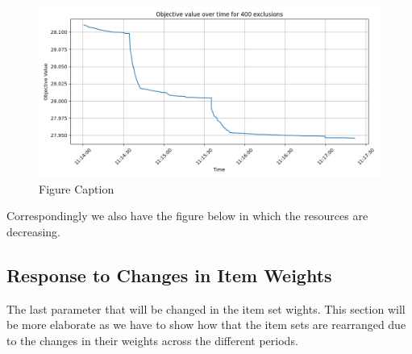 \documentclass[preprint,12pt,authoryear]{elsarticle}
\begin{document}
\begin{figure}[H]%
\centering%
\includegraphics[width=1.0\textwidth]{figures/objective-resource-increases.png}
\caption{Figure Caption}\label{fig:objective-resource-increases}
\end{figure}

Correspondingly we also have the figure below in which the resources are decreasing.

\subsection{Response to Changes in Item Weights}
The last parameter that will be changed in the item set wights. This section will be more elaborate as we have to show how that the item sets are rearranged due to the changes in their weights across the different periods.
\end{document}
